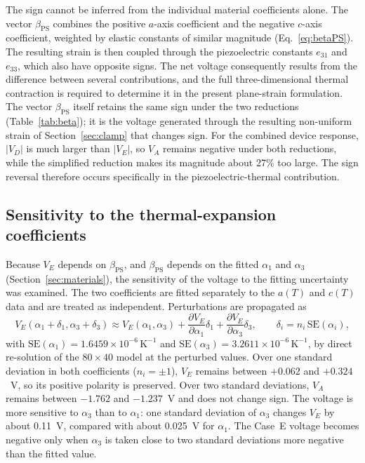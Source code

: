 \documentclass[pdflatex,sn-mathphys-num]{sn-jnl}
\begin{document}
The sign cannot be inferred from the individual material coefficients alone. The
vector $\beta_{\mathrm{PS}}$ combines the positive $a$-axis coefficient and the
negative $c$-axis coefficient, weighted by elastic constants of similar magnitude
(Eq.~\eqref{eq:betaPS}). The resulting strain is then coupled through the
piezoelectric constants $e_{31}$ and $e_{33}$, which also have opposite signs. The
net voltage consequently results from the difference between several contributions,
and the full three-dimensional thermal contraction is required to determine it in the
present plane-strain formulation. The vector $\beta_{\mathrm{PS}}$ itself retains the
same sign under the two reductions (Table~\ref{tab:beta}); it is the voltage generated
through the resulting non-uniform strain of Section~\ref{sec:clamp} that changes sign.
For the combined device response, $|V_D|$ is much larger than $|V_E|$, so $V_A$
remains negative under both reductions, while the simplified reduction makes its
magnitude about 27\% too large. The sign reversal therefore occurs specifically in
the piezoelectric-thermal contribution.

\subsection{Sensitivity to the thermal-expansion coefficients}
\label{sec:alpha}

Because $V_E$ depends on $\beta_{\mathrm{PS}}$, and $\beta_{\mathrm{PS}}$ depends on
the fitted $\alpha_1$ and $\alpha_3$ (Section~\ref{sec:materials}), the sensitivity
of the voltage to the fitting uncertainty was examined. The two coefficients are
fitted separately to the $a(T)$ and $c(T)$ data and are treated as independent.
Perturbations are propagated as
\begin{equation}
V_E(\alpha_1+\delta_1,\alpha_3+\delta_3)\approx
V_E(\alpha_1,\alpha_3)
+\frac{\partial V_E}{\partial\alpha_1}\delta_1
+\frac{\partial V_E}{\partial\alpha_3}\delta_3,
\qquad
\delta_i=n_i\,\mathrm{SE}(\alpha_i),
\label{eq:uncertaintyprop}
\end{equation}
with $\mathrm{SE}(\alpha_1)=1.6459\times10^{-6}\,\text{K}^{-1}$ and
$\mathrm{SE}(\alpha_3)=3.2611\times10^{-6}\,\text{K}^{-1}$, by direct re-solution of
the $80\times40$ model at the perturbed values. Over one standard deviation in both
coefficients ($n_i=\pm1$), $V_E$ remains between $+0.062$ and $+0.324$~V, so its
positive polarity is preserved. Over two standard deviations, $V_A$ remains between
$-1.762$ and $-1.237$~V and does not change sign. The voltage is more sensitive to
$\alpha_3$ than to $\alpha_1$: one standard deviation of $\alpha_3$ changes $V_E$ by
about 0.11~V, compared with about 0.025~V for $\alpha_1$. The Case~E voltage becomes
negative only when $\alpha_3$ is taken close to two standard deviations more negative
than the fitted value.
\end{document}

